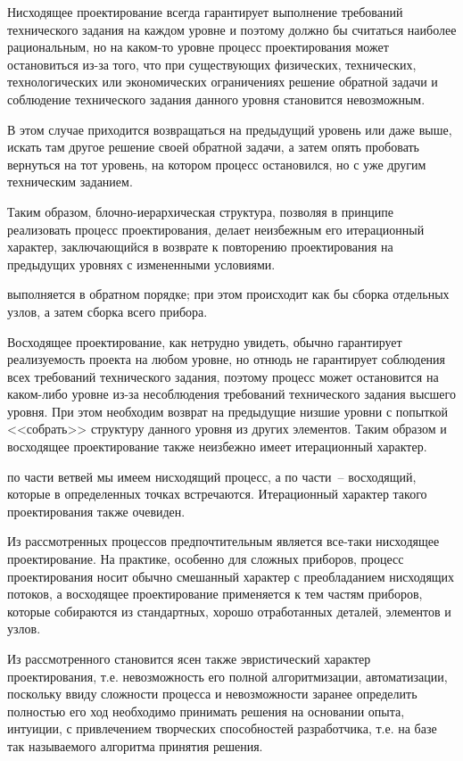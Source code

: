 Нисходящее проектирование всегда гарантирует выполнение требований технического задания на каждом уровне и поэтому должно бы считаться наиболее рациональным, но на каком-то уровне процесс проектирования может остановиться из-за того, что при существующих физических, технических, технологических или экономических ограничениях решение обратной задачи и соблюдение технического задания данного уровня становится невозможным. 

В этом случае приходится возвращаться на предыдущий уровень или даже выше, искать там другое решение своей обратной задачи, а затем опять пробовать вернуться на тот уровень, на котором процесс остановился, но с уже другим техническим заданием. 

Таким образом, блочно-иерархическая структура, позволяя в принципе реализовать процесс проектирования, делает неизбежным его итерационный характер, заключающийся в возврате к повторению проектирования на предыдущих уровнях с измененными условиями.

 выполняется в обратном порядке; при этом происходит как бы сборка отдельных узлов, а затем сборка всего прибора. 

Восходящее проектирование, как нетрудно увидеть, обычно гарантирует реализуемость проекта на любом уровне, но отнюдь не гарантирует соблюдения всех требований технического задания, поэтому процесс может остановится на каком-либо уровне из-за несоблюдения требований технического задания высшего уровня. При этом необходим возврат на предыдущие низшие уровни с попыткой <<собрать>> структуру данного уровня из других элементов. 
Таким образом и восходящее проектирование также неизбежно имеет итерационный характер.


 по части ветвей мы имеем нисходящий процесс, а по части~-- восходящий, которые в определенных точках встречаются. Итерационный характер такого проектирования также очевиден.

Из рассмотренных процессов предпочтительным является все-таки нисходящее проектирование. На практике, особенно для сложных приборов, процесс проектирования носит обычно смешанный характер с преобладанием нисходящих потоков, а восходящее проектирование применяется к тем частям приборов, которые собираются из стандартных, хорошо отработанных деталей, элементов и узлов.

Из рассмотренного становится ясен также эвристический характер проектирования, т.е. невозможность его полной алгоритмизации, автоматизации, поскольку ввиду сложности процесса и невозможности заранее определить полностью его ход необходимо принимать решения на основании опыта, интуиции, с привлечением творческих способностей разработчика, т.е. на базе так называемого алгоритма принятия решения. 

